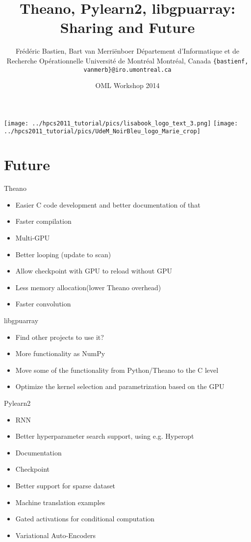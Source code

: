 \documentclass[utf8x,xcolor=pdftex,dvipsnames,table]{beamer}
\title{Theano, Pylearn2, libgpuarray: Sharing and Future}
\author{%
\footnotesize
Frédéric Bastien, Bart van Merriënboer \newline
Département d'Informatique et de Recherche Opérationnelle \newline
Université de Montréal \newline
Montréal, Canada \newline
\texttt{\{bastienf, vanmerb\}@iro.umontreal.ca} \newline \newline
}
\date{OML Workshop 2014}
\begin{document}
\begin{frame}[plain]
 \titlepage
 \vspace{-5em}
 \texttt{[image: ../hpcs2011\_tutorial/pics/lisabook\_logo\_text\_3.png]}
 \hfill
 \texttt{[image: ../hpcs2011\_tutorial/pics/UdeM\_NoirBleu\_logo\_Marie\_crop]}
\end{frame}

\section{Future}
\begin{frame}
  \tableofcontents[currentsection]
\end{frame}

\begin{frame}{Theano}\setcounter{page}{1}
\begin{itemize}
\item Easier C code development and better documentation of that
\item Faster compilation
\item Multi-GPU
\item Better looping (update to scan)
\item Allow checkpoint with GPU to reload without GPU
\item Less memory allocation(lower Theano overhead)
\item Faster convolution
\end{itemize}
\end{frame}

\begin{frame}{libgpuarray}
\begin{itemize}
\item Find other projects to use it?
\item More functionality as NumPy
\item Move some of the functionality from Python/Theano to the C level
\item Optimize the kernel selection and parametrization based on the GPU
\end{itemize}
\end{frame}

\begin{frame}{Pylearn2}
\begin{itemize}
\item RNN
\item Better hyperparameter search support, using e.g. Hyperopt
\item Documentation
\item Checkpoint
\item Better support for sparse dataset
\item Machine translation examples
\item Gated activations for conditional computation
\item Variational Auto-Encoders
\end{itemize}
\end{frame}
\end{document}
